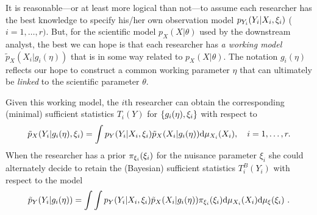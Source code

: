 It is reasonable---or at least more logical than not---to assume each researcher has the best knowledge to specify  his/her own observation model $p_{Y_i}(Y_i | X_i, \xi_i)$ ($i=1,\ldots, r)$.
But, for the scientific model $p_X(X|\theta)$ used by the downstream analyst, the best we can hope is that each researcher has \textit{a working model} $\tilde p_X(X_{i}|g_i(\eta))$ that is in some way related to $p_X(X|\theta)$.
The notation $g_i(\eta)$ reflects our hope to construct a common working parameter $\eta$ that can ultimately be \textit{linked} to the scientific parameter $\theta$.
 
Given this working model, the $i$th researcher can obtain the corresponding (minimal) sufficient statistics $T_i(Y)$ for $\{ g_i(\eta), \xi_i\}$ with respect to 
\begin{equation}\label{multiphase:e:prob}
  \pwork(Y_i | g_i(\workparam), \obsparam_i) = \int \pobs(Y_i | X_i, \obsparam_i) \pwork(X_i | g_i(\workparam)) \dd \mu_{X_i}(X_i), \quad i=1,\ldots, r.
\end{equation}
When the researcher has a prior $ \pi_{\xi_i}(\xi_i)$ for the nuisance parameter $\xi_i$ she could alternately decide to retain the (Bayesian) sufficient statistics $T_i^{B}(Y_{i})$ with respect to the model 
\begin{equation}\label{multiphase:e:prom}
  \pywork(Y_i | g_i(\workparam)) = \int \int \pobs(Y_i | X_i, \obsparam_i) \pwork(X_i | g_i(\workparam)) \pi_{\obsparam_i}(\obsparam_i) \dd \mu_{X_i}(X_i) \dd \mu_\obsparam(\obsparam_i)\ .
\end{equation} 


